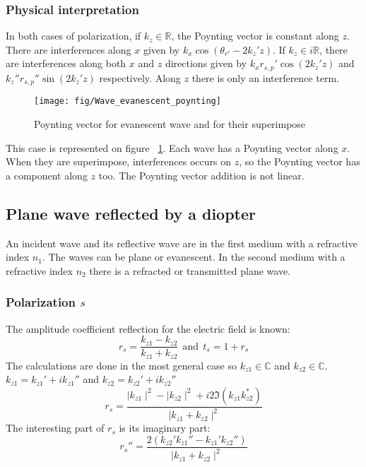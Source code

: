 \subsubsection{Physical interpretation}
In both cases of polarization, if $k_z\in \mathbb{R}$, the Poynting vector is constant along $z$. There are interferences along $x$ given by $k_x\cos(\theta _{r'}-2k_z'z)$.
If $k_z\in i\mathbb{R}$, there are interferences along both $x$ and $z$ directions given by $k_xr_{s,p}'\cos(2k_z'z)$ and $k_z''r_{s,p}''\sin(2k_z'z)$ respectively. Along $z$ there is only an interference term.
\begin{figure}[!h]
\texttt{[image: fig/Wave\_evanescent\_poynting]}
\caption{\label{fig:Wave_evanescent_poynting}Poynting vector for evanescent wave 
 and for their superimpose}
\end{figure}
This case is represented on figure ~\ref{fig:Wave_evanescent_poynting}. Each wave has a Poynting vector along $x$. When they are superimpose, interferences occurs on $z$, so the Poynting vector has a component along $z$ too. The Poynting vector addition is not linear.

\subsection{Plane wave reflected by a diopter}
An incident wave and its reflective wave are in the first medium with a refractive index $n_1$. The waves can be plane or evanescent. In the second medium with a refractive index $n_2$ there is a refracted or transmitted plane wave.  
\subsubsection{Polarization $s$}
The amplitude coefficient reflection for the electric field is known:
$$r_s = \frac{k_{z1}-k_{z2}}{k_{z1}+k_{z2}} \ \ \text{and} \ \ t_s=1+r_s$$
The calculations are done in the most general case so $k_{z1}\in \mathbb{C}$ and $k_{z2}\in \mathbb{C}$.\\
$k_{z1}=k_{z1}'+ik_{z1}''$ and $k_{z2}=k_{z2}'+ik_{z2}''$
\begin{equation*}
r_s=\frac{\mid k_{z1}\mid ^2-\mid k_{z2}\mid ^2+i2\Im(k_{z1}k_{z2}^*)}{\mid k_{z1}+k_{z2}\mid^2}
\end{equation*}
The interesting part of $r_s$ is its imaginary part:\\
\begin{equation*}
r_s'' = \frac{2(k_{z2}'k_{z1}''-k_{z1}'k_{z2}'')}{\mid k_{z1}+k_{z2}\mid^2}
\end{equation*}
